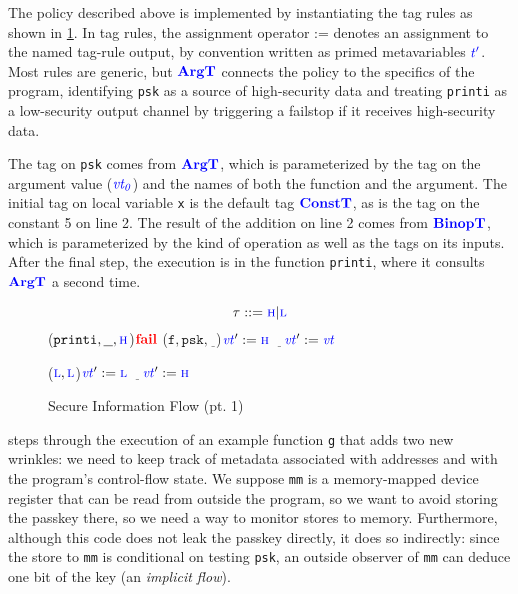 \documentclass{llncs}
\begin{document}
The policy described above is implemented by instantiating the tag rules as shown in \cref{fig:example1rules}. In tag rules,
the assignment operator := denotes an assignment to the named tag-rule output, by convention
written as primed metavariables \(\gentag[']\).  Most rules are generic, but
\(\argtname\) connects the policy to the specifics of the program, identifying {\tt psk}
as a source of high-security data and treating {\tt printi} as a low-security output channel by
triggering a failstop if it receives high-security data.

The tag on {\tt psk} comes from \(\argtname\), which is parameterized by the tag on the argument
value (\(\vt[_0]\)) and the names of both the function and the argument. The initial tag on local
variable {\tt x} is the default tag \(\constt\), as is the tag on the constant 5 on line 2.
The result of the addition on line 2 comes from \(\binoptname\), which is parameterized
by the kind of operation as well as the tags on its inputs.
After the final step, the execution is in the function {\tt printi}, where it consults
\(\argtname\) a second time.

\begin{figure}
  \begin{minipage}{0.4\textwidth}
    \[\tau::=\high | \low\]
    \argtruleblock
        {
          {(\(\mathtt{printi},\underline{~~},\high\))}{\(\fail\)}
          {(\(\mathtt{f},\mathtt{psk},\underline{~~}\))}{\(\vt':=\high\)}
          {\(\underline{~~~}\)}{\(\vt':=\vt\)}}
  \end{minipage}
  \begin{minipage}{0.5\textwidth}

    \binoptruleblock
        {\caseoftwo{\((\vt[_1],\vt[_2])\)}
          {(\(\low,\low\))}{\(\vt':=\low\)}
          {\(\underline{~~~}\)}{\(\vt':=\high\)}}
  \end{minipage}

  \caption{Secure Information Flow (pt. 1)}
  \label{fig:example1rules}
\end{figure}

 steps through the execution of an example function {\tt g} that adds two new wrinkles: we need to keep track of metadata associated with
addresses and with the program's control-flow state. We suppose {\tt mm} is
a memory-mapped device register that can be read from outside the program, so we want to avoid storing the passkey there,
so we need a way to monitor stores to memory.  Furthermore, although this code does not leak the passkey directly,
it does so indirectly: since the store to {\tt mm} is conditional on testing {\tt psk},
an outside observer of {\tt mm} can deduce one bit of the key (an {\em implicit flow}).
\end{document}
